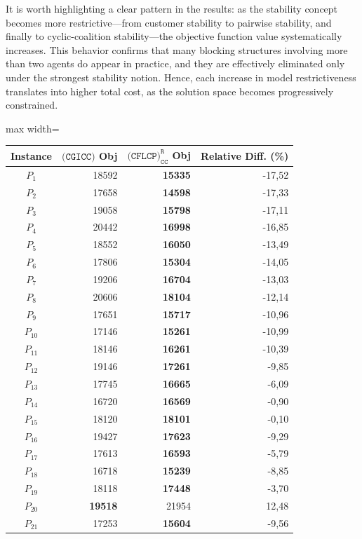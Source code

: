 \documentclass[preprint,11pt,authoryear]{elsarticle}
\begin{document}
It is worth highlighting a clear pattern in the results: as the stability concept becomes more restrictive---from customer stability to pairwise stability, and finally to cyclic-coalition stability---the objective function value systematically increases. This behavior confirms that many blocking structures involving more than two agents do appear in practice, and they are effectively eliminated only under the strongest stability notion. Hence, each increase in model restrictiveness translates into higher total cost, as the solution space becomes progressively constrained.
\begin{table}
\centering
\begin{adjustbox}{max width=\textwidth}
\begin{tabular}{c r r r}
\toprule
Instance & $\texttt{(CGICC)}$ Obj & $\texttt{(CFLCP)}_{\texttt{CC}}^\texttt{R}$ Obj & Relative Diff. (\%) \\
\midrule
$P_1$&18592&\textbf{15335}&-17,52 \\
$P_2$&17658&\textbf{14598}&-17,33 \\
$P_3$&19058&\textbf{15798}&-17,11 \\
$P_4$&20442&\textbf{16998}&-16,85 \\[2mm]
$P_5$&18552&\textbf{16050}&-13,49 \\
$P_6$&17806&\textbf{15304}&-14,05 \\
$P_7$&19206&\textbf{16704}&-13,03 \\
$P_8$&20606&\textbf{18104}&-12,14\\[2mm]
$P_9$&17651&\textbf{15717}&-10,96 \\
$P_{10}$&17146&\textbf{15261}&-10,99 \\
$P_{11}$&18146&\textbf{16261}&-10,39 \\
$P_{12}$&19146&\textbf{17261}&-9,85 \\[2mm]
$P_{13}$&17745&\textbf{16665}&-6,09 \\
$P_{14}$&16720&\textbf{16569}&-0,90 \\
$P_{15}$&18120&\textbf{18101}&-0,10 \\
$P_{16}$&19427&\textbf{17623}&-9,29 \\[2mm]
$P_{17}$&17613&\textbf{16593}&-5,79 \\
$P_{18}$&16718&\textbf{15239}&-8,85 \\
$P_{19}$&18118&\textbf{17448}&-3,70 \\
$P_{20}$&\textbf{19518}&21954&12,48 \\[2mm]
$P_{21}$&17253&\textbf{15604}&-9,56 \\

\end{tabular}
\end{adjustbox}
\end{table}
\end{document}
